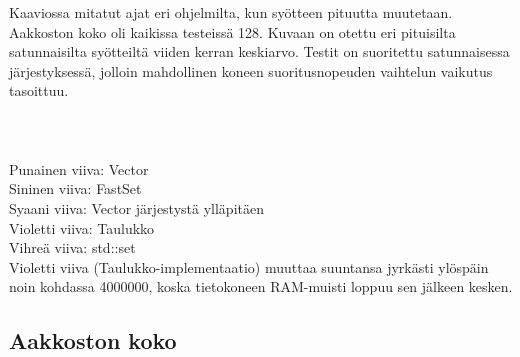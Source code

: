 \documentclass{article}
\begin{document}
            Kaaviossa mitatut ajat eri ohjelmilta, kun syötteen pituutta muutetaan. Aakkoston koko oli kaikissa testeissä 128.
            Kuvaan on otettu eri pituisilta satunnaisilta syötteiltä viiden kerran keskiarvo. Testit on suoritettu satunnaisessa
            järjestyksessä, jolloin mahdollinen koneen suoritusnopeuden vaihtelun vaikutus tasoittuu.
            \\ \\
             \\ \\
            Punainen viiva: Vector  \\
            Sininen viiva: FastSet  \\
            Syaani viiva: Vector järjestystä ylläpitäen \\ 
            Violetti viiva: Taulukko  \\
            Vihreä viiva: std::set \\
            Violetti viiva (Taulukko-implementaatio) muuttaa suuntansa jyrkästi ylöspäin noin kohdassa 4000000, koska tietokoneen
            RAM-muisti loppuu sen jälkeen kesken.
            
        \newpage
        \subsection{Aakkoston koko}
        
\end{document}
